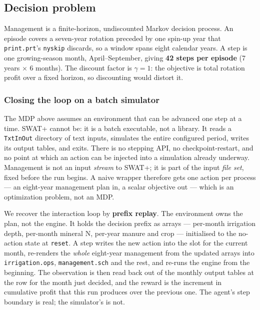 \documentclass[a4paper,fleqn]{cas-sc}
\begin{document}
\subsection{Decision problem}\label{sec:mdp}

Management is a finite-horizon, undiscounted Markov decision process. An episode covers
a seven-year rotation preceded by one spin-up year that \texttt{print.prt}'s
\texttt{nyskip} discards, so a window spans eight calendar years. A step is one
growing-season month, April--September, giving \textbf{42 steps per episode}
(7 years $\times$ 6 months). The discount factor is $\gamma = 1$: the objective is total
rotation profit over a fixed horizon, so discounting would distort it.

\subsubsection{Closing the loop on a batch simulator}\label{sec:prefix-replay}

The MDP above assumes an environment that can be advanced one step at a time. SWAT+
cannot be: it is a batch executable, not a library. It reads a \texttt{TxtInOut}
directory of text inputs, simulates the entire configured period, writes its output
tables, and exits. There is no stepping API, no checkpoint-restart, and no point at
which an action can be injected into a simulation already underway. Management is not
an input \emph{stream} to SWAT+; it is part of the input \emph{file set}, fixed before
the run begins. A naive wrapper therefore gets one action per process --- an eight-year
management plan in, a scalar objective out --- which is an optimization problem, not an
MDP.

We recover the interaction loop by \textbf{prefix replay}. The environment owns the
plan, not the engine. It holds the decision prefix as arrays --- per-month irrigation
depth, per-month mineral N, per-year manure and crop --- initialised to the no-action
state at \texttt{reset}. A step writes the new action into the slot for the current
month, re-renders the \emph{whole} eight-year management from the updated arrays into
\texttt{irrigation.ops}, \texttt{management.sch} and the rest, and re-runs the engine
from the beginning. The observation is then read back out of the monthly output tables
at the row for the month just decided, and the reward is the increment in cumulative
profit that this run produces over the previous one. The agent's step boundary is real;
the simulator's is not.
\end{document}
